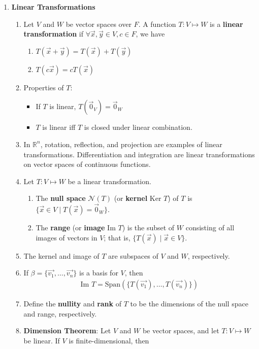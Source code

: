 \documentclass[10pt]{article}
\begin{document}
\begin{multicols*}{2}
\begin{enumerate}
    \columnbreak
    \item \textbf{Linear Transformations}
    \begin{enumerate}
        \item Let $V$ and $W$ be vector spaces over $F$. A function $T:V \mapsto W$ is a \textbf{linear transformation} if $\forall \vec{x}, \vec{y} \in V, c \in F$, we have
        \begin{enumerate}
            \item $T(\vec{x} + \vec{y}) = T(\vec{x}) + T(\vec{y})$
            \item $T(c\vec{x}) = cT(\vec{x})$
        \end{enumerate}
        \item Properties of $T$:
        \begin{itemize}
            \item If $T$ is linear, $T(\vec{0}_V) = \vec{0}_W$
            \item $T$ is linear iff $T$ is closed under linear combination.
        \end{itemize}
        \item In $\mathbb{R}^n$, rotation, reflection, and projection are examples of linear transformations. Differentiation and integration are linear transformations on vector spaces of continuous functions.
        \item Let $T: V \mapsto W$ be a linear transformation. 
        \begin{enumerate}
            \item The \textbf{null space} $\mathcal{N}(T)$ (or \textbf{kernel} Ker $T$) of $T$ is $\{\vec{x} \in V \mid T(\vec{x}) = \vec{0}_W \}$.
            \item The \textbf{range} (or \textbf{image} Im $T$) is the subset of $W$ consisting of all images of vectors in $V$; that is, $\{ T(\vec{x}) \mid \vec{x} \in V \}$.
        \end{enumerate}
        \item The kernel and image of $T$ are subspaces of $V$ and $W$, respectively.
        \item If $\beta = \{ \vec{v_1}, \hdots, \vec{v_n} \}$ is a basis for $V$, then 
        \begin{align*}
            \text{Im }T = \text{Span}\left(\{ T(\vec{v_1}), \hdots, T(\vec{v_n}) \}\right)
        \end{align*}
        \item Define the \textbf{nullity} and \textbf{rank} of $T$ to be the dimensions of the null space and range, respectively. \item \textbf{Dimension Theorem}: Let $V$ and $W$ be vector spaces, and let $T: V \mapsto W$ be linear. If $V$ is finite-dimensional, then

\end{enumerate}
\end{enumerate}
\end{multicols*}
\end{document}
